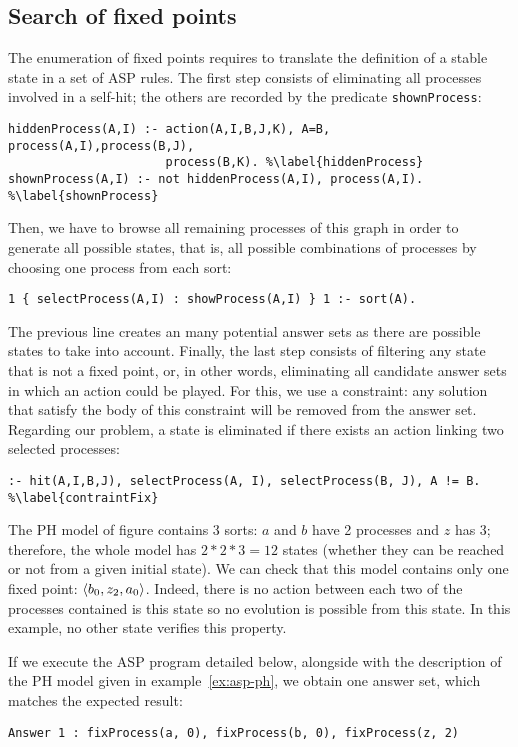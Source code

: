 \subsection{Search of fixed points}

The enumeration of fixed points requires to translate the definition of a stable state
in a set of ASP rules.
The first step consists of eliminating all processes involved in a self-hit;
the others are recorded by the predicate \texttt{shownProcess}:
\begin{lstlisting}
hiddenProcess(A,I) :- action(A,I,B,J,K), A=B, process(A,I),process(B,J),
                      process(B,K). %\label{hiddenProcess}
shownProcess(A,I) :- not hiddenProcess(A,I), process(A,I). %\label{shownProcess}
\end{lstlisting}
Then, we have to browse all remaining processes of this graph
in order to generate all possible states,
that is, all possible combinations of processes by choosing one process from each sort:
\begin{lstlisting}
1 { selectProcess(A,I) : showProcess(A,I) } 1 :- sort(A).
\end{lstlisting}
The previous line creates an many potential answer sets as there are possible states
to take into account.
Finally, the last step consists of filtering any state that is not a fixed point,
or, in other words, eliminating all candidate answer sets in which an action could be played.
For this, we use a constraint:
any solution that satisfy the body of this constraint will be removed from the answer set.
Regarding our problem, a state is eliminated if there exists an action linking two selected processes:
\begin{lstlisting}
:- hit(A,I,B,J), selectProcess(A, I), selectProcess(B, J), A != B. %\label{contraintFix}
\end{lstlisting}

\begin{example}
The PH model of figure  contains 3 sorts:
$a$ and $b$ have 2 processes and $z$ has 3; therefore, the whole model has $2*2*3 = 12$ states (whether they can be reached or not from a given initial state).
We can check that this model contains only one fixed point: $\langle b_0, z_2, a_0 \rangle$.
Indeed, there is no action between each two of the processes contained is this state so no evolution is possible from this state. 
In this example, no other state verifies this property.

If we execute the ASP program detailed below,
alongside with the description of the PH model given in example~\ref{ex:asp-ph},
we obtain one answer set, which matches the expected result:
\begin{lstlisting}[numbers=none]
Answer 1 : fixProcess(a, 0), fixProcess(b, 0), fixProcess(z, 2)
\end{lstlisting}
\end{example}